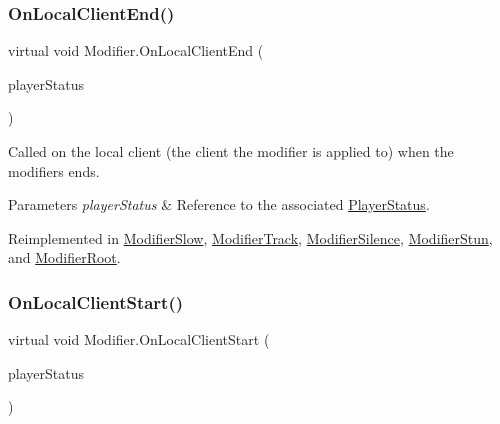 \hypertarget{class_modifier_a1ea2aa04b05628c1965570396e390281}{}\label{class_modifier_a1ea2aa04b05628c1965570396e390281} 
\subsubsection{\texorpdfstring{On\+Local\+Client\+End()}{OnLocalClientEnd()}}
{\footnotesize\ttfamily virtual void Modifier.\+On\+Local\+Client\+End (\begin{DoxyParamCaption}\item[{\hyperlink{class_player_status}{Player\+Status}}]{player\+Status }\end{DoxyParamCaption})\hspace{0.3cm}{\ttfamily [virtual]}}



Called on the local client (the client the modifier is applied to) when the modifiers ends. 


\begin{DoxyParams}{Parameters}
{\em player\+Status} & Reference to the associated \hyperlink{class_player_status}{Player\+Status}.\\
\hline
\end{DoxyParams}


Reimplemented in \hyperlink{class_modifier_slow_a0682d3da4434ef281fbffccf34501eb3}{Modifier\+Slow}, \hyperlink{class_modifier_track_a3a5af2acdd67953efd467e10591a21d4}{Modifier\+Track}, \hyperlink{class_modifier_silence_a51051e6002b6eb984df8aa9c9c22ee7b}{Modifier\+Silence}, \hyperlink{class_modifier_stun_acb8d45decc6446515b0492ae57684092}{Modifier\+Stun}, and \hyperlink{class_modifier_root_a2310d2c479ff8a6a8d371b931c7a03ce}{Modifier\+Root}.

\hypertarget{class_modifier_a5cce7ec6a5a595265a6bf5a6f7e40eb9}{}\label{class_modifier_a5cce7ec6a5a595265a6bf5a6f7e40eb9} 
\subsubsection{\texorpdfstring{On\+Local\+Client\+Start()}{OnLocalClientStart()}}
{\footnotesize\ttfamily virtual void Modifier.\+On\+Local\+Client\+Start (\begin{DoxyParamCaption}\item[{\hyperlink{class_player_status}{Player\+Status}}]{player\+Status }\end{DoxyParamCaption})\hspace{0.3cm}{\ttfamily [virtual]}}



